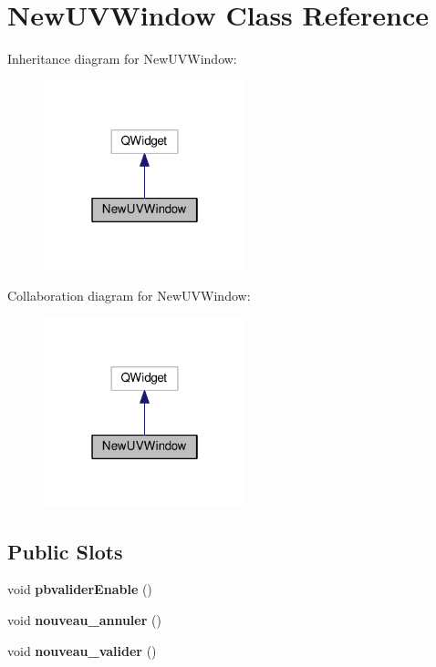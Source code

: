 \hypertarget{class_new_u_v_window}{\section{New\-U\-V\-Window Class Reference}
\label{class_new_u_v_window}
}


Inheritance diagram for New\-U\-V\-Window\-:
\nopagebreak
\begin{figure}[H]
\begin{center}
\leavevmode
\includegraphics[width=166pt]{class_new_u_v_window__inherit__graph}
\end{center}
\end{figure}


Collaboration diagram for New\-U\-V\-Window\-:
\nopagebreak
\begin{figure}[H]
\begin{center}
\leavevmode
\includegraphics[width=166pt]{class_new_u_v_window__coll__graph}
\end{center}
\end{figure}
\subsection*{Public Slots}
\begin{DoxyCompactItemize}
\item 
\hypertarget{class_new_u_v_window_a13338b8bde9709bfd6b17fe51a201c13}{void {\bfseries pbvalider\-Enable} ()}\label{class_new_u_v_window_a13338b8bde9709bfd6b17fe51a201c13}

\item 
\hypertarget{class_new_u_v_window_a8c423065c475cdf6b9fde1a37e514f48}{void {\bfseries nouveau\-\_\-annuler} ()}\label{class_new_u_v_window_a8c423065c475cdf6b9fde1a37e514f48}

\item 
\hypertarget{class_new_u_v_window_a51046bb303e7f8c19131f4b8d38f8e7c}{void {\bfseries nouveau\-\_\-valider} ()}\label{class_new_u_v_window_a51046bb303e7f8c19131f4b8d38f8e7c}

\end{DoxyCompactItemize}
